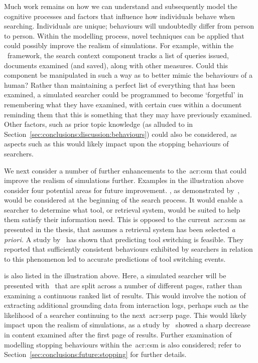 Much work remains on how we can understand and subsequently model the cognitive processes and factors that influence how individuals behave when searching. Individuals are unique; behaviours will undoubtedly differ from person to person. Within the modelling process, novel techniques can be applied that could possibly improve the realism of simulations. For example, within the \simiir~framework, the search context component tracks a list of queries issued, documents examined (and saved), along with other measures. Could this component be manipulated in such a way as to better mimic the behaviours of a human? Rather than maintaining a perfect list of everything that has been examined, a simulated searcher could be programmed to become `forgetful' in remembering what they have examined, with certain cues within a document reminding them that this is something that they may have previously examined. Other factors, such as prior topic knowledge (as alluded to in Section~\ref{sec:conclusions:discussion:behaviours}) could also be considered, as aspects such as this would likely impact upon the stopping behaviours of searchers.

We next consider a number of further enhancements to the~\gls{acr:csm} that could improve the realism of simulations further. Examples in the illustration above consider four potential areas for future improvement. , as demonstrated by~\cite{thomas2014modelling_behaviour}, would be considered at the beginning of the search process. It would enable a searcher to determine what tool, or retrieval system, would be suited to help them satisfy their information need. This is opposed to the current~\gls{acr:csm} as presented in the thesis, that assumes a retrieval system has been selected \emph{a priori.} A study by~\cite{white2009tool_switching} has shown that predicting tool switching is feasible. They reported that sufficiently consistent behaviours exhibited by searchers in relation to this phenomenon led to accurate predictions of tool switching events.

 is also listed in the illustration above. Here, a simulated searcher will be presented with~ that are split across a number of different pages, rather than examining a continuous ranked list of results. This would involve the notion of extracting additional grounding data from interaction logs, perhaps such as the likelihood of a searcher continuing to the next~\gls{acr:serp} page. This would likely impact upon the realism of simulations, as a study by~\cite{jansen2005analysis} showed a sharp decrease in content examined after the first page of results. Further examination of modelling stopping behaviours within the~\gls{acr:csm} is also considered; refer to Section~\ref{sec:conclusions:future:stopping} for further details.


